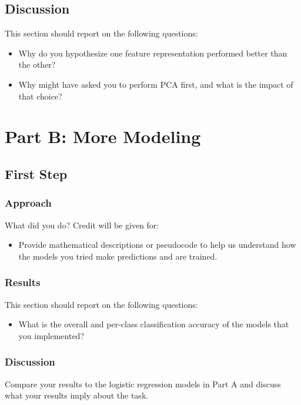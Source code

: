 \documentclass[11pt]{article}
\begin{document}
\subsection{Discussion}

This section should report on the following questions: 

\begin{itemize}
  \item Why do you hypothesize one feature representation performed better than the other?  
  \item Why might have asked you to perform PCA first, and what is the impact of that choice?
  \end{itemize}

\section{Part B: More Modeling}

\subsection{First Step}

\subsubsection{Approach}

What did you do? Credit will be given for:

  \begin{itemize}
  \item Provide mathematical descriptions or pseudocode to help us understand how the models you tried make predictions and are trained.
  \end{itemize}

\subsubsection{Results}
This section should report on the following questions: 

\begin{itemize}
\item  What is the overall and per-class classification accuracy of the models that you implemented?
\end{itemize}


\subsubsection{Discussion}
Compare your results to the logistic regression models in Part A and discuss what your results imply about the task.
\end{document}
